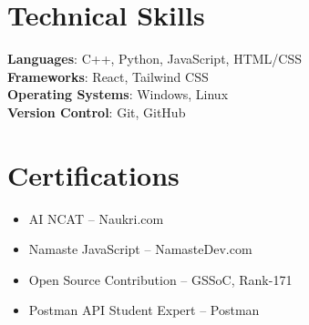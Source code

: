 \documentclass[letterpaper,11pt]{article}
\newcommand{\certItemListStart}{
  \begin{itemize}[leftmargin=*, label=\textbullet, itemsep=2pt, topsep=2pt, parsep=0pt, partopsep=0pt]
}
\newcommand{\certItemListEnd}{\end{itemize}\vspace{-5pt}}
\newcommand{\certItem}[1]{\item\small{#1}\vspace{-2pt}}
\begin{document}
%
\section{Technical Skills}
 \begin{itemize}[leftmargin=0.15in, label={}]
    \small{\item{
     \textbf{Languages}{: C++, Python, JavaScript, HTML/CSS} \\
     \textbf{Frameworks}{: React, Tailwind CSS} \\
     \textbf{Operating Systems}{: Windows, Linux} \\
     \textbf{Version Control}{: Git, GitHub} \\
    }}
 \end{itemize}





\section{Certifications}
\certItemListStart
  \certItem{AI NCAT – Naukri.com}
  \certItem{Namaste JavaScript – NamasteDev.com}
  \certItem{Open Source Contribution – GSSoC, Rank-171}
  \certItem{Postman API Student Expert – Postman}
\certItemListEnd



\end{document}
